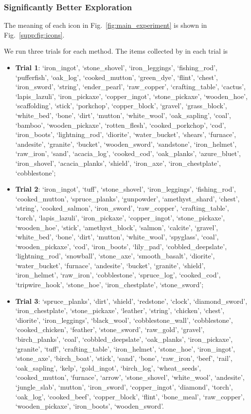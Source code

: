 \subsubsection{Significantly Better Exploration}

The meaning of each icon in Fig.~\ref{fig:main_experiment} is shown in Fig.~\ref{supp:fig:icons}.

We run three trials for each method. The items collected by \voyager in each trial is \begin{itemize}
    \item \textbf{Trial 1}: {`iron\_ingot', `stone\_shovel', `iron\_leggings', `fishing\_rod', `pufferfish', `oak\_log', `cooked\_mutton', `green\_dye', `flint', `chest', `iron\_sword', `string', `ender\_pearl', `raw\_copper', `crafting\_table', `cactus', `lapis\_lazuli', `iron\_pickaxe', `copper\_ingot', `stone\_pickaxe', `wooden\_hoe', `scaffolding', `stick', `porkchop', `copper\_block', `gravel', `grass\_block', `white\_bed', `bone', `dirt', `mutton', `white\_wool', `oak\_sapling', `coal', `bamboo', `wooden\_pickaxe', `rotten\_flesh', `cooked\_porkchop', `cod', `iron\_boots', `lightning\_rod', `diorite', `water\_bucket', `shears', `furnace', `andesite', `granite', `bucket', `wooden\_sword', `sandstone', `iron\_helmet', `raw\_iron', `sand', `acacia\_log', `cooked\_cod', `oak\_planks', `azure\_bluet', `iron\_shovel', `acacia\_planks', `shield', `iron\_axe', `iron\_chestplate', `cobblestone'};
    \item \textbf{Trial 2}: {`iron\_ingot', `tuff', `stone\_shovel', `iron\_leggings', `fishing\_rod', `cooked\_mutton', `spruce\_planks', `gunpowder', `amethyst\_shard', `chest', `string', `cooked\_salmon', `iron\_sword', `raw\_copper', `crafting\_table', `torch', `lapis\_lazuli', `iron\_pickaxe', `copper\_ingot', `stone\_pickaxe', `wooden\_hoe', `stick', `amethyst\_block', `salmon', `calcite', `gravel', `white\_bed', `bone', `dirt', `mutton', `white\_wool', `spyglass', `coal', `wooden\_pickaxe', `cod', `iron\_boots', `lily\_pad', `cobbled\_deepslate', `lightning\_rod', `snowball', `stone\_axe', `smooth\_basalt', `diorite', `water\_bucket', `furnace', `andesite', `bucket', `granite', `shield', `iron\_helmet', `raw\_iron', `cobblestone', `spruce\_log', `cooked\_cod', `tripwire\_hook', `stone\_hoe', `iron\_chestplate', `stone\_sword'};
    \item \textbf{Trial 3}: {`spruce\_planks', `dirt', `shield', `redstone', `clock', `diamond\_sword', `iron\_chestplate', `stone\_pickaxe', `leather', `string', `chicken', `chest', `diorite', `iron\_leggings', `black\_wool', `cobblestone\_wall', `cobblestone', `cooked\_chicken', `feather', `stone\_sword', `raw\_gold', `gravel', `birch\_planks', `coal', `cobbled\_deepslate', `oak\_planks', `iron\_pickaxe', `granite', `tuff', `crafting\_table', `iron\_helmet', `stone\_hoe', `iron\_ingot', `stone\_axe', `birch\_boat', `stick', `sand', `bone', `raw\_iron', `beef', `rail', `oak\_sapling', `kelp', `gold\_ingot', `birch\_log', `wheat\_seeds', `cooked\_mutton', `furnace', `arrow', `stone\_shovel', `white\_wool', `andesite', `jungle\_slab', `mutton', `iron\_sword', `copper\_ingot', `diamond', `torch', `oak\_log', `cooked\_beef', `copper\_block', `flint', `bone\_meal', `raw\_copper', `wooden\_pickaxe', `iron\_boots', `wooden\_sword'}.
\end{itemize}
